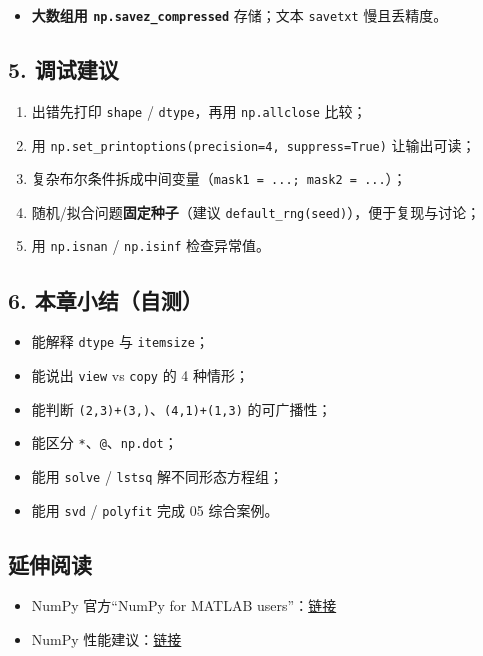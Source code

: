\begin{itemize}
\tightlist
\item
  \textbf{大数组用 \texttt{np.savez\_compressed}} 存储；文本
  \texttt{savetxt} 慢且丢精度。
\end{itemize}

\subsection{5. 调试建议}\label{ux8c03ux8bd5ux5efaux8bae}

\begin{enumerate}
\def\labelenumi{\arabic{enumi}.}
\tightlist
\item
  出错先打印 \texttt{shape} / \texttt{dtype}，再用 \texttt{np.allclose}
  比较；
\item
  用 \texttt{np.set\_printoptions(precision=4,\ suppress=True)}
  让输出可读；
\item
  复杂布尔条件拆成中间变量（\texttt{mask1\ =\ ...;\ mask2\ =\ ...}）；
\item
  随机/拟合问题\textbf{固定种子}（建议
  \texttt{default\_rng(seed)}），便于复现与讨论；
\item
  用 \texttt{np.isnan} / \texttt{np.isinf} 检查异常值。
\end{enumerate}

\subsection{6.
本章小结（自测）}\label{ux672cux7ae0ux5c0fux7ed3ux81eaux6d4b}

\begin{itemize}
\tightlist
\item[$\square$]
  能解释 \texttt{dtype} 与 \texttt{itemsize}；
\item[$\square$]
  能说出 \texttt{view} vs \texttt{copy} 的 4 种情形；
\item[$\square$]
  能判断 \texttt{(2,3)+(3,)}、\texttt{(4,1)+(1,3)} 的可广播性；
\item[$\square$]
  能区分 \texttt{*}、\texttt{@}、\texttt{np.dot}；
\item[$\square$]
  能用 \texttt{solve} / \texttt{lstsq} 解不同形态方程组；
\item[$\square$]
  能用 \texttt{svd} / \texttt{polyfit} 完成 05 综合案例。
\end{itemize}

\subsection{延伸阅读}\label{ux5ef6ux4f38ux9605ux8bfb-5}

\begin{itemize}
\tightlist
\item
  NumPy 官方``NumPy for MATLAB
  users''：\href{https://numpy.org/doc/stable/user/numpy-for-matlab-users.html}{链接}
\item
  NumPy
  性能建议：\href{https://numpy.org/doc/stable/user/performance.html}{链接}
\end{itemize}

\newpage
